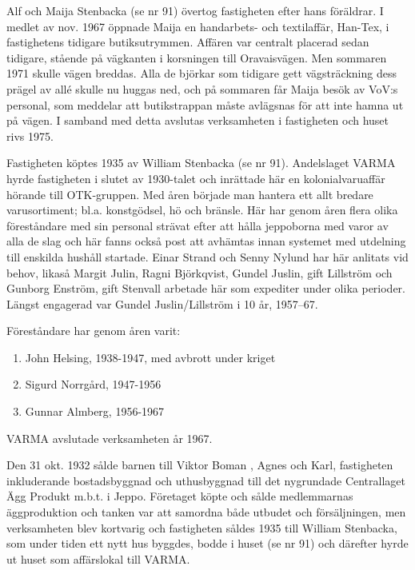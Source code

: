 Alf och Maija Stenbacka (se nr 91) övertog fastigheten efter hans föräldrar. I medlet av nov. 1967 öppnade Maija en handarbets- och textilaffär, Han-Tex, i fastighetens tidigare butiksutrymmen. Affären var centralt placerad sedan tidigare, stående på vägkanten i korsningen till Oravaisvägen. Men sommaren 1971 skulle vägen breddas. Alla de björkar som tidigare gett vägsträckning dess prägel av allé skulle nu huggas ned, och på sommaren får Maija besök av VoV:s personal, som meddelar att butikstrappan måste avlägsnas för att inte hamna ut på vägen. I samband med detta avslutas verksamheten i fastigheten och huset rivs 1975.


Fastigheten köptes 1935 av William Stenbacka (se nr 91). Andelslaget VARMA hyrde fastigheten i slutet av 1930-talet och inrättade här en kolonialvaruaffär hörande till OTK-gruppen. Med åren började man hantera ett allt bredare varusortiment; bl.a. konstgödsel, hö och bränsle. Här har genom åren flera  olika föreståndare med sin personal strävat efter att hålla jeppoborna med varor av alla de slag och här fanns också post att avhämtas innan systemet med utdelning till enskilda hushåll startade. Einar Strand och Senny Nylund har här anlitats vid behov, likaså Margit Julin, Ragni Björkqvist, Gundel Juslin, gift Lillström och Gunborg Enström, gift Stenvall arbetade här som expediter under olika perioder. Längst engagerad var Gundel Juslin/Lillström i 10 år, 1957--67.

Föreståndare har genom åren varit:
\begin{enumerate}
  \item John Helsing, 1938-1947, med avbrott under kriget
  \item Sigurd Norrgård, 1947-1956
  \item Gunnar Almberg, 1956-1967
\end{enumerate}

VARMA avslutade verksamheten år 1967.


Den 31 okt. 1932 sålde barnen till Viktor Boman , Agnes och Karl, fastigheten inkluderande bostadsbyggnad och uthusbyggnad till det nygrundade Centrallaget Ägg Produkt m.b.t. i Jeppo. Företaget köpte och sålde medlemmarnas äggproduktion och tanken var att samordna både utbudet och försäljningen, men verksamheten blev kortvarig och fastigheten såldes 1935 till William Stenbacka, som under tiden ett nytt hus byggdes, bodde i huset (se nr 91) och därefter hyrde ut huset som affärslokal till VARMA.


